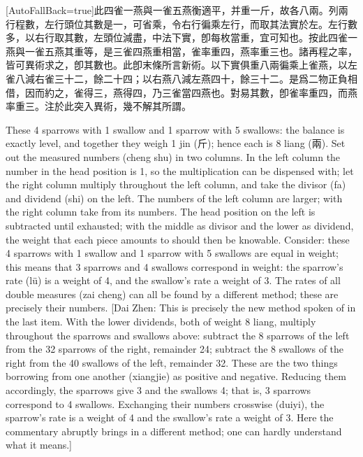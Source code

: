 \documentclass[11pt]{article}
\newcommand{\zhsmall}{\footnotesize\color{black!70}}
\newcommand{\unitlabel}[1]{\marginpar{\raggedleft\tiny\color{gray}#1}}
\newenvironment{unitzh}{\par\CJKfontspec{Noto Serif CJK SC}[AutoFallBack=true]\large\linespread{1.25}\selectfont}{\par}
\newenvironment{uniten}{\par\small\color{black!85}}{\par\medskip}
\begin{document}
\begin{unitzh}\unitlabel{jiuzhang-036.10}此四雀一燕與一雀五燕衡適平，并重一斤，故各八兩。列兩行程數，左行頭位其數是一，可省乘，令右行徧乘左行，而取其法實於左。左行數多，以右行取其數，左頭位減盡，中法下實，卽每枚當重，宜可知也。按此四雀一燕與一雀五燕其重等，是三雀四燕重相當，雀率重四，燕率重三也。諸再程之率，皆可異術求之，卽其數也。{\zhsmall 此卽末條所言新術。以下實俱重八兩徧乘上雀燕，以左雀八減右雀三十二，餘二十四；以右燕八減左燕四十，餘三十二。是爲二物正負相借，因而約之，雀得三，燕得四，乃三雀當四燕也。對易其數，卽雀率重四，而燕率重三。注於此突入異術，幾不解其所謂。}\end{unitzh}
\begin{uniten}These 4 sparrows with 1 swallow and 1 sparrow with 5 swallows: the balance is exactly level, and together they weigh 1 jin (斤); hence each is 8 liang (兩). Set out the measured numbers (cheng shu) in two columns. In the left column the number in the head position is 1, so the multiplication can be dispensed with; let the right column multiply throughout the left column, and take the divisor (fa) and dividend (shi) on the left. The numbers of the left column are larger; with the right column take from its numbers. The head position on the left is subtracted until exhausted; with the middle as divisor and the lower as dividend, the weight that each piece amounts to should then be knowable. Consider: these 4 sparrows with 1 swallow and 1 sparrow with 5 swallows are equal in weight; this means that 3 sparrows and 4 swallows correspond in weight: the sparrow's rate (lü) is a weight of 4, and the swallow's rate a weight of 3. The rates of all double measures (zai cheng) can all be found by a different method; these are precisely their numbers. [Dai Zhen: This is precisely the new method spoken of in the last item. With the lower dividends, both of weight 8 liang, multiply throughout the sparrows and swallows above: subtract the 8 sparrows of the left from the 32 sparrows of the right, remainder 24; subtract the 8 swallows of the right from the 40 swallows of the left, remainder 32. These are the two things borrowing from one another (xiangjie) as positive and negative. Reducing them accordingly, the sparrows give 3 and the swallows 4; that is, 3 sparrows correspond to 4 swallows. Exchanging their numbers crosswise (duiyi), the sparrow's rate is a weight of 4 and the swallow's rate a weight of 3. Here the commentary abruptly brings in a different method; one can hardly understand what it means.]\end{uniten}
\end{document}
